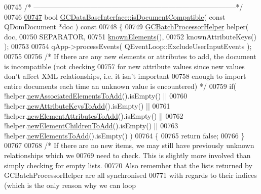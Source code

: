 \begin{DoxyCode}
{{{{{{{{{{{{{{{{{{{{{{{{{{{{{{00745 \textcolor{comment}{/*
      --------------------------------------------------------------------------------------*/}
00746 
\hypertarget{gcdatabaseinterface_8cpp_source_l00747}{}\hyperlink{class_g_c_data_base_interface_ae16d516cbefe58ccf9ef0e8ece4a394f}{00747} \textcolor{keywordtype}{bool} \hyperlink{class_g_c_data_base_interface_ae16d516cbefe58ccf9ef0e8ece4a394f}{GCDataBaseInterface::isDocumentCompatible}( \textcolor{keyword}{const} QDomDocument *doc )\textcolor{keyword}{ const}
00748 \textcolor{keyword}{}\{
00749   \hyperlink{class_g_c_batch_processor_helper}{GCBatchProcessorHelper} helper( doc,
00750                                  SEPARATOR,
00751                                  \hyperlink{class_g_c_data_base_interface_a6c4eabd4f39a1c23ab320bb0dbc855d4}{knownElements}(),
00752                                  knownAttributeKeys() );
00753 
00754   qApp->processEvents( QEventLoop::ExcludeUserInputEvents );
00755 
00756   \textcolor{comment}{/* If there are any new elements or attributes to add, the document is
       incompatible (not checking}
00757 \textcolor{comment}{    for new attribute values since new values don't affect XML relationships,
       i.e. it isn't important}
00758 \textcolor{comment}{    enough to import entire documents each time an unknown value is
       encountered) */}
00759   \textcolor{keywordflow}{if}( !helper.\hyperlink{class_g_c_batch_processor_helper_abf195046fd00e629b2ce5e3bd6bcf90d}{newAssociatedElementsToAdd}().isEmpty() ||
00760       !helper.\hyperlink{class_g_c_batch_processor_helper_a605ca53123f28467df39cabeb3aa65cd}{newAttributeKeysToAdd}().isEmpty() ||
00761       !helper.\hyperlink{class_g_c_batch_processor_helper_a640ca9bd78b7da0796fdfb82fefce8b6}{newElementAttributesToAdd}().isEmpty() ||
00762       !helper.\hyperlink{class_g_c_batch_processor_helper_a89c14c3740c7cb57c937ef8db99b4af1}{newElementChildrenToAdd}().isEmpty() ||
00763       !helper.\hyperlink{class_g_c_batch_processor_helper_afdedbc674698c019ebd2a3938a239661}{newElementsToAdd}().isEmpty() )
00764   \{
00765     \textcolor{keywordflow}{return} \textcolor{keyword}{false};
00766   \}
00767 
00768   \textcolor{comment}{/* If there are no new items, we may still have previously unknown
       relationships which we}
00769 \textcolor{comment}{    need to check.  This is slightly more involved than simply checking for
       empty lists.}
00770 \textcolor{comment}{    Also remember that the lists returned by GCBatchProcessorHelper are all
       synchronised}
00771 \textcolor{comment}{    with regards to their indices (which is the only reason why we can loop
}}}}}}}}}}}}}}}}}}}}}}}}}}}}}}}
\end{DoxyCode}
